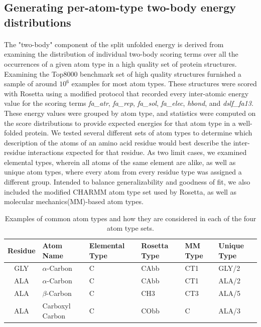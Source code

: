 \subsection{Generating per-atom-type two-body energy distributions}
\paragraph{}
The "two-body" component of the split unfolded energy is derived from examining the distribution of individual two-body scoring terms over all the occurrences of a given atom type in a high quality set of protein structures.
Examining the Top8000 benchmark set of high quality structures\cite{lovell_structure_2003} furnished a sample of around $10^6$ examples for most atom types. These structures were scored with Rosetta using a modified protocol that recorded every inter-atomic energy value for the scoring terms \textit{fa\_atr}, \textit{fa\_rep}, \textit{fa\_sol}, \textit{fa\_elec}, \textit{hbond}, and \textit{dslf\_fa13}.
These energy values were grouped by atom type, and statistics were computed on the score distributions to provide expected energies for that atom type in a well-folded protein.
We tested several different sets of atom types to determine which description of the atoms of an amino acid residue would best describe the inter-residue interactions expected for that residue.
As two limit cases, we examined elemental types, wherein all atoms of the same element are alike, as well as unique atom types, where every atom from every residue type was assigned a different group.
Intended to balance generalizability and goodness of fit, we also included the modified CHARMM atom type set used by Rosetta\cite{leaver-fay_chapter_2011,bernard_charmm_1983}, as well as molecular mechanics(MM)-based atom types\cite{renfrew_incorporation_2012}.


\begin{table}[!htbp]

\fontsize{9pt}{9pt}
\selectfont

\begin{tabular}{c|lllll}
Residue & Atom Name & Elemental Type & Rosetta Type & MM Type & Unique Type\\
\hline
GLY & $\alpha$-Carbon & C & CAbb & CT1 & GLY/2\\
ALA & $\alpha$-Carbon & C & CAbb & CT1 & ALA/2\\
ALA & $\beta$-Carbon & C & CH3 & CT3 & ALA/5\\
ALA & Carboxyl Carbon & C & CObb & C & ALA/3\\
\end{tabular}

\fontsize{10pt}{11pt}
\selectfont
\caption{Examples of common atom types and how they are considered in each of the four atom type sets.}
\label{tab:atypes_example}

\end{table}



